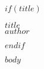 \documentclass[$if(fontsize)$$fontsize$$else$11pt$endif$]{article}
\begin{document}
$if(title)$
\begin{center}
    {\Huge \bfseries $title$}\\[1ex]
    {\large $author$}\\[4ex]
\end{center}
$endif$

$body$
\end{document}
